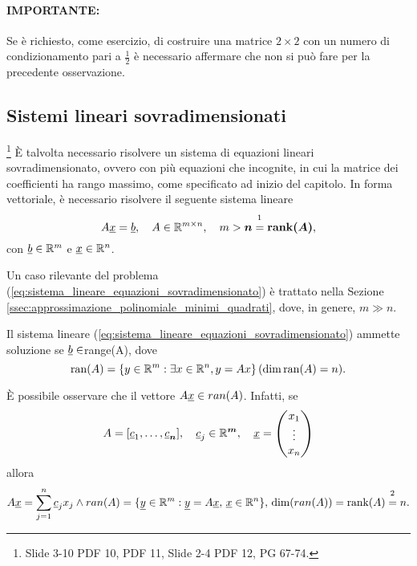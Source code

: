 \paragraph{IMPORTANTE:} Se è richiesto, come esercizio, di costruire  una matrice $2\times 2$ con un numero di condizionamento pari a $\frac{1}{2}$ è necessario affermare che non si può fare per la precedente osservazione.

\subsection{Sistemi lineari sovradimensionati}\label{ssec:sistemi_lineari_sovradimensionati}
\footnote{Slide 3-10 PDF 10, PDF 11, Slide 2-4 PDF 12, PG 67-74.}
È talvolta necessario risolvere un sistema di equazioni lineari sovradimensionato, ovvero con più equazioni che incognite, in cui la matrice dei coefficienti ha rango massimo, come specificato ad inizio del capitolo. In forma vettoriale, è necessario risolvere il seguente sistema lineare
\begin{equation}\label{eq:sistema_lineare_equazioni_sovradimensionato}
    A\uline x =\uline b,\quad A\in\mathbb R^{m\times n},\quad m>\boldsymbol n\overset{\footnotemark}{=}\boldsymbol{\rank(A)},
\end{equation}
con $\uline b\in\mathbb R^m$ e $\uline x\in\mathbb R^n$.

Un caso rilevante del problema (\ref{eq:sistema_lineare_equazioni_sovradimensionato}) è trattato nella Sezione \ref{ssec:approssimazione_polinomiale_minimi_quadrati}, dove, in genere, $m\gg n$.

Il sistema lineare (\ref{eq:sistema_lineare_equazioni_sovradimensionato}) ammette soluzione se $\uline b\in$\gls{range(A)}, dove
\begin{equation*}
	\operatorname{ran}(A)=\{y\in\mathbb R^m:\exists x\in\mathbb R^n, y=Ax\}\, (\dim\operatorname{ran}(A)=n).
\end{equation*}

È possibile osservare che il vettore $A\uline x\in ran(A)$. Infatti, se
\begin{equation*}
    A=[\uline c_1, \hdots,\uline c_{\boldsymbol n}],\quad \uline c_j\in\mathbb R^{\boldsymbol m},\quad \uline x=
    \begin{pmatrix}
        x_1\\
        \vdots\\
        x_n
    \end{pmatrix}
\end{equation*}
allora
\begin{equation*}
    A\uline x = \sum_{j=1}^n\uline c_j x_j\wedge ran(A)=\{\uline y\in\mathbb R^m:\uline y = A\uline x, \,\uline x\in\mathbb R^n\},\, \dim(ran(A))=\rank(A)\overset{\footnotemark}{=}n.
\end{equation*}

